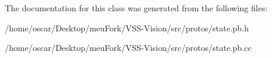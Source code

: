 The documentation for this class was generated from the following files\-:\begin{DoxyCompactItemize}
\item 
/home/oscar/\-Desktop/meu\-Fork/\-V\-S\-S-\/\-Vision/src/protos/state.\-pb.\-h\item 
/home/oscar/\-Desktop/meu\-Fork/\-V\-S\-S-\/\-Vision/src/protos/state.\-pb.\-cc\end{DoxyCompactItemize}
